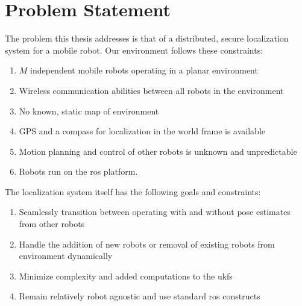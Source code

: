 \documentclass[thesis.tex]{subfile}
\begin{document}
%

\section{Problem Statement} \label{sec:Problem Statement}
The problem this thesis addresses is that of a distributed, secure localization system for a mobile robot. Our environment follows these constraints:
\begin{enumerate}
\item $M$ independent mobile robots operating in a planar environment
\item Wireless communication abilities between all robots in the environment
\item No known, static map of environment
\item GPS and a compass for localization in the world frame is available
\item Motion planning and control of other robots is unknown and unpredictable
\item Robots run on the \gls{ros} platform.
\end{enumerate}

The localization system itself has the following goals and constraints:
\begin{enumerate}
\item Seamlessly transition between operating with and without pose estimates from other robots
\item Handle the addition of new robots or removal of existing robots from environment dynamically
\item Minimize complexity and added computations to the \glspl{ukf}
\item Remain relatively robot agnostic and use standard \gls{ros} constructs
\end{enumerate}
\end{document}
